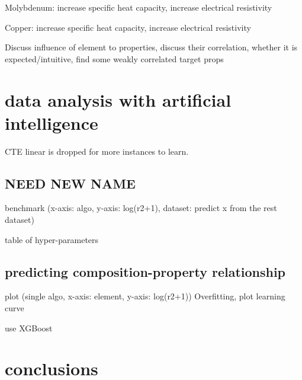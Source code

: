 \documentclass[10pt,aps,prb,amsmath,amssymb,twocolumn,letterpaper,nobalancelastpage,final,citeautoscript,floatfix,raggedbottom,superscriptaddress]{revtex4-1}
\begin{document}
Molybdenum: increase specific heat capacity, increase electrical resistivity

Copper: increase specific heat capacity, increase electrical resistivity

Discuss influence of element to properties, discuss their correlation, whether it is expected/intuitive, find some weakly correlated target props

\section{data analysis with artificial intelligence}

CTE linear is dropped for more instances to learn.
\subsection{NEED NEW NAME}
benchmark (x-axis: algo, y-axis: log(r2+1), dataset: predict x from the rest dataset)

table of hyper-parameters

\subsection{predicting composition-property relationship}
plot (single algo, x-axis: element, y-axis: log(r2+1))
Overfitting, plot learning curve

use XGBoost

\section{conclusions}

%
\end{document}

